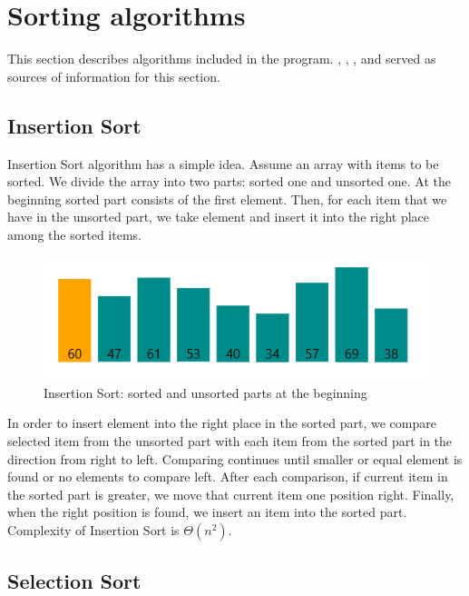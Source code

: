 \documentclass[
  field=inf,
  biblatex,
  language=english,
  glossaries,
  theorems=false,
  sourcecodes=false,
  index
]{kidiplom}
\begin{document}
\newpage
\section{Sorting algorithms}

This section describes algorithms included in the program. \cite{cormen}, \citep{alm2}, \cite{knuth3}, \cite{sedgewik} and \cite{geeks} served as sources of information for this section.

\subsection{Insertion Sort}
\label{sec:insertion}
Insertion Sort algorithm has a simple idea. Assume an array with items to be sorted. We divide the array into two parts: sorted one and unsorted one. At the beginning sorted part consists of the first element. Then, for each item that we have in the unsorted part, we take element and insert it into the right place among the sorted items.

\begin{figure}[H]
\begin{center}
	
	\includegraphics[scale=0.7]{img/Insertion.png}
	\caption{Insertion Sort: sorted and unsorted parts at the beginning}\label{fig:insert}
\end{center}
\end{figure}

In order to insert element into the right place in the sorted part, we compare selected item from the unsorted part with each item from the sorted part in the direction from right to left. Comparing continues until smaller or equal element is found or no elements to compare left. After each comparison, if current item in the sorted part is greater, we move that current item one position right. Finally, when the right position is found, we insert an item into the sorted part. Complexity of Insertion Sort is $\Theta(n^2)$.

\subsection{Selection Sort}
\label{sec:selection}
\end{document}

